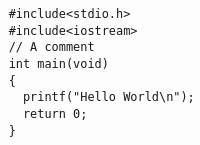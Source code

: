 








\begin{lstlisting}
    #include<stdio.h>
    #include<iostream>
    // A comment
    int main(void)
    {
      printf("Hello World\n");
      return 0;
    }
\end{lstlisting}               
       
